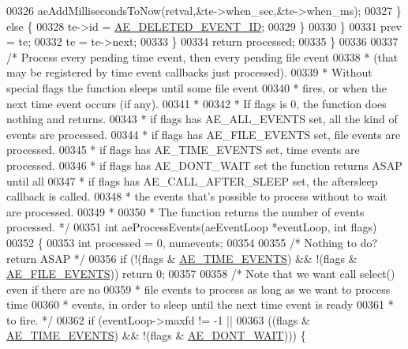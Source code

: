 \begin{DoxyCode}
00326                 aeAddMillisecondsToNow(retval,&te->when\_sec,&te->when\_ms);
00327             \} \textcolor{keywordflow}{else} \{
00328                 te->id = \hyperlink{ae_8h_aee0b2fc7b62d8e06517136a91d7f635d}{AE\_DELETED\_EVENT\_ID};
00329             \}
00330         \}
00331         prev = te;
00332         te = te->next;
00333     \}
00334     \textcolor{keywordflow}{return} processed;
00335 \}
00336 
00337 \textcolor{comment}{/* Process every pending time event, then every pending file event}
00338 \textcolor{comment}{ * (that may be registered by time event callbacks just processed).}
00339 \textcolor{comment}{ * Without special flags the function sleeps until some file event}
00340 \textcolor{comment}{ * fires, or when the next time event occurs (if any).}
00341 \textcolor{comment}{ *}
00342 \textcolor{comment}{ * If flags is 0, the function does nothing and returns.}
00343 \textcolor{comment}{ * if flags has AE\_ALL\_EVENTS set, all the kind of events are processed.}
00344 \textcolor{comment}{ * if flags has AE\_FILE\_EVENTS set, file events are processed.}
00345 \textcolor{comment}{ * if flags has AE\_TIME\_EVENTS set, time events are processed.}
00346 \textcolor{comment}{ * if flags has AE\_DONT\_WAIT set the function returns ASAP until all}
00347 \textcolor{comment}{ * if flags has AE\_CALL\_AFTER\_SLEEP set, the aftersleep callback is called.}
00348 \textcolor{comment}{ * the events that's possible to process without to wait are processed.}
00349 \textcolor{comment}{ *}
00350 \textcolor{comment}{ * The function returns the number of events processed. */}
00351 \textcolor{keywordtype}{int} aeProcessEvents(aeEventLoop *eventLoop, \textcolor{keywordtype}{int} flags)
00352 \{
00353     \textcolor{keywordtype}{int} processed = 0, numevents;
00354 
00355     \textcolor{comment}{/* Nothing to do? return ASAP */}
00356     \textcolor{keywordflow}{if} (!(flags & \hyperlink{ae_8h_acdc6c5c42302bc81959ed645b22800aa}{AE\_TIME\_EVENTS}) && !(flags & \hyperlink{ae_8h_ac3fe42c648aaa679f6bffaeb1f8f9ea8}{AE\_FILE\_EVENTS})) \textcolor{keywordflow}{return} 0;
00357 
00358     \textcolor{comment}{/* Note that we want call select() even if there are no}
00359 \textcolor{comment}{     * file events to process as long as we want to process time}
00360 \textcolor{comment}{     * events, in order to sleep until the next time event is ready}
00361 \textcolor{comment}{     * to fire. */}
00362     \textcolor{keywordflow}{if} (eventLoop->maxfd != -1 ||
00363         ((flags & \hyperlink{ae_8h_acdc6c5c42302bc81959ed645b22800aa}{AE\_TIME\_EVENTS}) && !(flags & \hyperlink{ae_8h_a95ce6d5997d5b55cef5e1977dc80af28}{AE\_DONT\_WAIT}))) \{

\end{DoxyCode}
